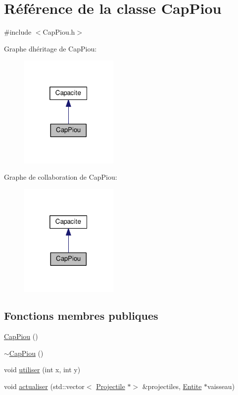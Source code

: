 \hypertarget{class_cap_piou}{}\section{Référence de la classe Cap\+Piou}
\label{class_cap_piou}


{\ttfamily \#include $<$Cap\+Piou.\+h$>$}



Graphe d\textquotesingle{}héritage de Cap\+Piou\+:
\nopagebreak
\begin{figure}[H]
\begin{center}
\leavevmode
\includegraphics[width=136pt]{class_cap_piou__inherit__graph}
\end{center}
\end{figure}


Graphe de collaboration de Cap\+Piou\+:
\nopagebreak
\begin{figure}[H]
\begin{center}
\leavevmode
\includegraphics[width=136pt]{class_cap_piou__coll__graph}
\end{center}
\end{figure}
\subsection*{Fonctions membres publiques}
\begin{DoxyCompactItemize}
\item 
\hyperlink{class_cap_piou_aa2ed61fb1313a447cf8444399001750d}{Cap\+Piou} ()
\item 
\hyperlink{class_cap_piou_a35d7e0b0c14d6a6e01ba0a053a8a60bd}{$\sim$\+Cap\+Piou} ()
\item 
void \hyperlink{class_cap_piou_a20ed7a993ce209a3df246f655f107f22}{utiliser} (int x, int y)
\item 
void \hyperlink{class_cap_piou_aabdcaa253f10db2bca12e750005485fc}{actualiser} (std\+::vector$<$ \hyperlink{class_projectile}{Projectile} $\ast$$>$ \&projectiles, \hyperlink{class_entite}{Entite} $\ast$vaisseau)
\end{DoxyCompactItemize}
